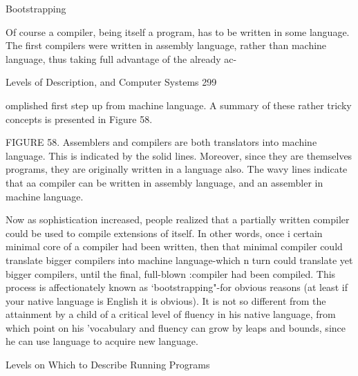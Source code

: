                                                Bootstrapping

       Of course a compiler, being itself a program, has to be written in some language.
       The first compilers were written in assembly language, rather than machine
       language, thus taking full advantage of the already ac-




Levels of Description, and Computer Systems                                                299

       omplished first step up from machine language. A summary of these rather tricky
       concepts is presented in Figure 58.

                                                     FIGURE 58. Assemblers and
                                                     compilers are both translators into
                                                     machine language. This is indicated
                                                     by the solid lines. Moreover, since
                                                     they are themselves programs, they
                                                     are originally written in a language
                                                     also. The wavy lines indicate that aa
                                                     compiler can be written in assembly
                                                     language, and an assembler in
                                                     machine language.




       Now as sophistication increased, people realized that a partially written compiler
       could be used to compile extensions of itself. In other words, once i certain
       minimal core of a compiler had been written, then that minimal compiler could
       translate bigger compilers into machine language-which n turn could translate yet
       bigger compilers, until the final, full-blown :compiler had been compiled. This
       process is affectionately known as `bootstrapping"-for obvious reasons (at least if
       your native language is English it is obvious). It is not so different from the
       attainment by a child of a critical level of fluency in his native language, from
       which point on his 'vocabulary and fluency can grow by leaps and bounds, since
       he can use language to acquire new language.

                       Levels on Which to Describe Running Programs

